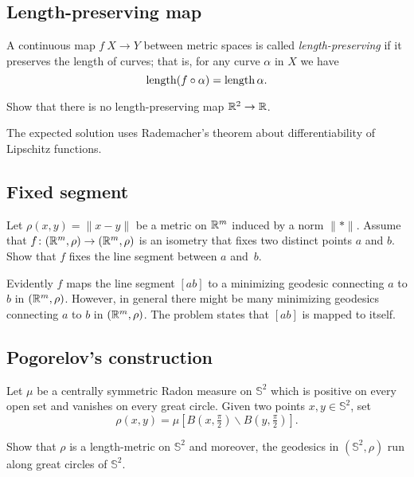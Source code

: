 \subsection*{Length-preserving map\thm}
\label{two2one} 

A continuous map $f\:X\to Y$ between metric spaces is called \emph{length-preserving} if it preserves the length of curves; 
that is, for any curve $\alpha$ in $X$ we have
\[\operatorname{\rm length}(f\circ\alpha)=\operatorname{\rm length}\alpha.\]

\begin{pr}
Show that there is no length-preserving map $\mathbb{R}^2\to \mathbb{R}$.
\end{pr}


The expected solution uses Rademacher's theorem \cite{rademacher} about differentiability of Lipschitz functions. 



\subsection*{Fixed segment}
\label{Fixed segment}

\begin{pr}
Let $\rho(x,y)=\|x-y\|$ be a metric on $\mathbb{R}^m$ induced by a norm $\|{*}\|$.
Assume that $f\colon(\mathbb{R}^m,\rho)\to(\mathbb{R}^m,\rho)$ is an isometry that fixes two distinct points $a$ and $b$.
Show that $f$ fixes the line segment between $a$ and~$b$.
\end{pr}

Evidently $f$ maps the line segment $[ab]$ to a minimizing geodesic connecting $a$ to $b$ in $(\mathbb{R}^m,\rho)$.
However, in general there might be many minimizing geodesics connecting $a$ to $b$ in $(\mathbb{R}^m,\rho)$.
The problem states that $[ab]$ is mapped to itself.


\subsection*{Pogorelov's construction\easy}
\label{Pogorelov's construction}

\begin{pr}
Let $\mu$ be a centrally symmetric Radon measure on $\mathbb{S}^2$ which is positive on every open set and vanishes on every great circle.
Given two points $x,y\in \mathbb{S}^2$,
set 
\[\rho(x,y)=\mu[B(x,\tfrac \pi2)\backslash B(y,\tfrac\pi2)].\]

Show that $\rho$ is a length-metric on $\mathbb{S}^2$
and moreover, the geodesics in $(\mathbb{S}^2,\rho)$ run along great circles of $\mathbb{S}^2$.
\end{pr}


